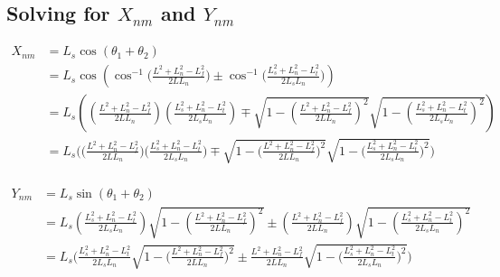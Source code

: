 \documentclass[11pt, landscape]{article}
\begin{document}
\subsection{Solving for $X_{nm}$ and $Y_{nm}$}

\begin{align}
  X_{nm} &= L_s\cos(\theta_1 + \theta_2)\\
  &= L_s\cos\left(\cos^{-1}\bigg(\frac{L^2+L_{n}^2-L_{f}^2}{2LL_{n}}\bigg) \pm\cos^{-1}\bigg(\frac{L_{s}^2+L_{n}^2-L_{t}^2}{2L_{s}L_{n}}\bigg)\right)\\
  &= L_s\left(\left(\frac{L^2+L_{n}^2-L_{f}^2}{2LL_{n}}\right)\left(\frac{L_{s}^2+L_{n}^2-L_{t}^2}{2L_{s}L_{n}}\right) \mp \sqrt{1-\left(\frac{L^2+L_{n}^2-L_{f}^2}{2LL_{n}}\right)^2}\sqrt{1-\left(\frac{L_{s}^2+L_{n}^2-L_{t}^2}{2L_{s}L_{n}}\right)^2}\right)\\
  &= L_{s}\Bigg( \Big(\frac{L^2+L_{n}^2-L_{f}^2}{2LL_{n}}\Big)\Big(\frac{L_{s}^2+L_{n}^2-L_{t}^2}{2L_{s}L_{n}}\Big) \mp \sqrt{1-\bigg(\frac{L^2+L_{n}^2-L_{f}^2}{2LL_{n}}\bigg)^2}\sqrt{1-\bigg(\frac{L_{s}^2+L_{n}^2-L_{t}^2}{2L_{s}L_{n}}\bigg)^2} \Bigg)\\
\end{align}

\begin{align}
  Y_{nm} &= L_s\sin(\theta_1 + \theta_2)\\
  &= L_s\left(\frac{L_{s}^2+L_{n}^2-L_{t}^2}{2L_{s}L_{n}}\right)\sqrt{1-\left(\frac{L^2+L_{n}^2-L_{f}^2}{2LL_{n}}\right)^2} \pm \left(\frac{L^2+L_{n}^2-L_{f}^2}{2LL_{n}}\right)\sqrt{1-\left(\frac{L_{s}^2+L_{n}^2-L_{t}^2}{2L_{s}L_{n}}\right)^2}\\
  &= L_{s}\Bigg(\frac{L_{s}^2+L_{n}^2-L_{t}^2}{2L_{s}L_{n}}\sqrt{1-\bigg(\frac{L^2+L_{n}^2-L_{f}^2}{2LL_{n}}\bigg)^2} \pm \frac{L^2+L_{n}^2-L_{f}^2}{2LL_{n}}\sqrt{1-\bigg(\frac{L_{s}^2+L_{n}^2-L_{t}^2}{2L_{s}L_{n}}\bigg)^2} \Bigg)\\
\end{align}
\end{document}
